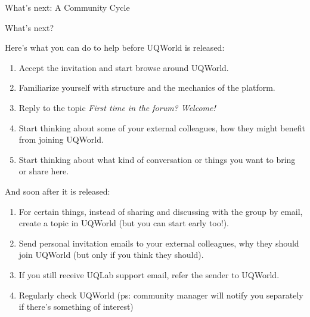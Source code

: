 \documentclass[]{rsuqbeamernew}
\begin{document}
\begin{frame}[t]{What's next: A Community Cycle}
  
  
\end{frame}

\begin{frame}[t]{What's next?}
  
Here's what you can do to help before UQWorld is released:

\begin{enumerate}
  \item Accept the invitation and start browse around UQWorld.
  \item Familiarize yourself with structure and the mechanics of the platform.
  \item Reply to the topic \emph{First time in the forum? Welcome!}
  \item Start thinking about some of your external colleagues, how they might benefit from joining UQWorld.
  \item Start thinking about what kind of conversation or things you want to bring or share here.
\end{enumerate}

And soon after it is released:

\begin{enumerate}
  \item For certain things, instead of sharing and discussing with the group by email, create a topic in UQWorld (but you can start early too!). 
  \item Send personal invitation emails to your external colleagues, why they should join UQWorld (but only if you think they should).
  \item If you still receive UQLab support email, refer the sender to UQWorld.
  \item Regularly check UQWorld (ps: community manager will notify you separately if there's something of interest)
\end{enumerate}

\end{frame}
\end{document}
